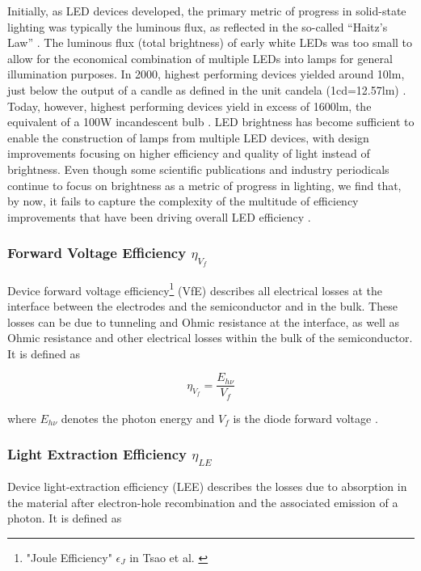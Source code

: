 \documentclass[twoside,twocolumn,9pt]{article}
\begin{document}
Initially, as LED devices developed, the primary metric of progress in solid-state lighting was typically the luminous flux, as reflected in the so-called “Haitz’s Law” \cite{haitz1999case}\cite{haitz2011solid}. The luminous flux (total brightness) of early white LEDs was too small to allow for the economical combination of multiple LEDs into lamps for general illumination purposes. In 2000, highest performing devices yielded around 10lm, just below the output of a candle as defined in the unit candela (1cd=12.57lm) \cite{haitz2011solid}. Today, however, highest performing devices yield in excess of 1600lm, the equivalent of a 100W incandescent bulb \cite{cree2020bright}. LED brightness has become sufficient to enable the construction of lamps from multiple LED devices, with design improvements focusing on higher efficiency and quality of light instead of brightness. Even though some scientific publications and industry periodicals continue to focus on brightness as a metric of progress in lighting, we find that, by now, it fails to capture the complexity of the multitude of efficiency improvements that have been driving overall LED efficiency \cite{weinold2021compound}. 

\subsubsection{Forward Voltage Efficiency $\eta_{V_f}$}

Device forward voltage efficiency\footnote{"Joule Efficiency" $\epsilon_J$ in Tsao et al. \cite{tsao2010solid}} (VfE) describes all electrical losses at the interface between the electrodes and the semiconductor and in the bulk. These losses can be due to tunneling and Ohmic resistance at the interface, as well as Ohmic resistance and other electrical losses within the bulk of the semiconductor. It is defined as

\begin{equation}
    \eta_{V_f} = \frac{E_{h\nu}}{V_f}
\end{equation}

where $E_{h\nu}$ denotes the photon energy and $V_f$ is the diode forward voltage \cite{schubert2018light}\cite{tsao2010solid}.

\subsubsection{Light Extraction Efficiency $\eta_{LE}$}

Device light-extraction efficiency (LEE) describes the  losses due to absorption in the material after electron-hole recombination and the associated emission of a photon. It is defined as
\end{document}
